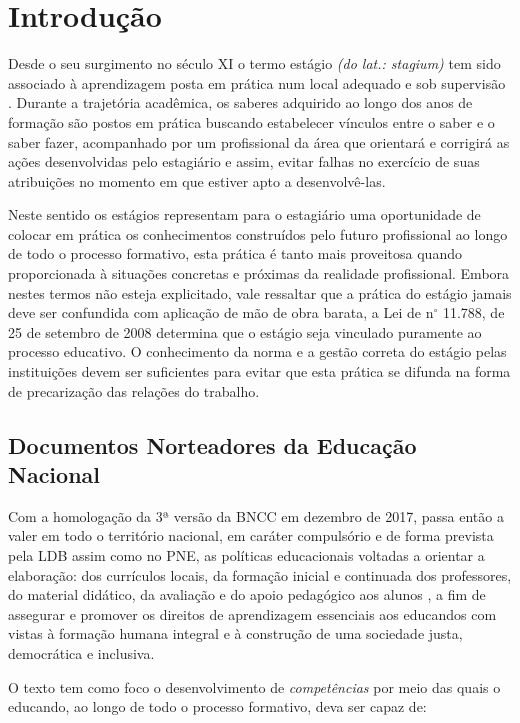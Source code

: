 \chapter{Introdução}
\label{cap:Introducao}

Desde o seu surgimento no século XI o termo estágio \emph{(do lat.: stagium)} tem sido associado à aprendizagem posta em prática num local adequado e sob supervisão \cite{COLOMBO:2014}. Durante a trajetória acadêmica, os saberes adquirido ao longo dos anos de formação são postos em prática buscando estabelecer vínculos entre o saber e o saber fazer, acompanhado por um profissional da área que orientará e corrigirá as ações desenvolvidas pelo estagiário e assim, evitar falhas no exercício de suas atribuições no momento em que estiver apto a desenvolvê-las.

Neste sentido os estágios representam para o estagiário uma oportunidade de colocar em prática os conhecimentos construídos pelo futuro profissional ao longo de todo o processo formativo, esta prática é tanto mais proveitosa quando proporcionada à situações concretas e próximas da realidade profissional. Embora nestes termos não esteja explicitado, vale ressaltar que a prática do estágio jamais deve ser confundida com aplicação de mão de obra barata, a Lei de n$^\circ$ 11.788, de 25 de setembro de 2008 determina que o estágio seja vinculado puramente ao processo educativo. O conhecimento da norma e a gestão correta do estágio pelas instituições devem ser suficientes para evitar que esta prática se difunda na forma de precarização das relações do trabalho.

\section{Documentos Norteadores da Educação Nacional}
Com a homologação da 3ª versão da \ac{BNCC} em dezembro de 2017, passa então a valer em todo o território nacional, em caráter compulsório e de forma prevista pela \ac{LDB} assim como no \ac{PNE}, as políticas educacionais voltadas a orientar a elaboração: dos currículos locais, da formação inicial e continuada dos professores, do material didático, da avaliação e do apoio pedagógico aos alunos \cite{BRASIL:2017}, a fim de assegurar e promover os direitos de aprendizagem essenciais aos educandos com vistas à formação humana integral e à construção de uma sociedade justa, democrática e inclusiva.

O texto tem como foco o desenvolvimento de \emph{competências} por meio das quais o educando, ao longo de todo o processo formativo, deva ser capaz de:

